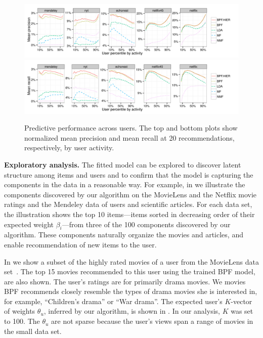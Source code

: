 \begin{figure}[t!]
\centering
\includegraphics[width=\textwidth]{figures/mean_precision_at_20_by_user_percentile.pdf}\\
\includegraphics[width=\textwidth]{figures/mean_recall_at_20_by_user_percentile.pdf}\\
\caption{Predictive performance across users. The top and bottom plots
  show normalized mean precision and mean recall at 20
  recommendations, respectively, by user activity.}
\label{fig:precision_recall_by_user_activity}
\end{figure}


{\bf Exploratory analysis.} The fitted model can be explored to
discover latent structure among items and users and to confirm that
the model is capturing the components in the data in a reasonable
way. For example, in  we illustrate the components
discovered by our algorithm on the MovieLens and the Netflix movie
ratings and the Mendeley data of users and scientific articles. For
each data set, the illustration shows the top 10 items---items sorted
in decreasing order of their expected weight $\beta_i$---from three of
the 100 components discovered by our algorithm. These components
naturally organize the movies and articles, and enable recommendation
of new items to the user.

In  we show a subset of the highly rated
movies of a user from the MovieLens data
set~\cite{Herlocker:1999}. The top 15 movies recommended to this user
using the trained BPF model, are also shown. The user's ratings are
for primarily drama movies. We movies BPF recommends closely resemble
the types of drama movies she is interested in, for example,
``Children's drama'' or ``War drama''. The expected user's $K$-vector
of weights $\theta_u$, inferred by our algorithm, is shown in
. In our analysis, $K$ was set to
100. The $\theta_u$ are not sparse because the user's views span a
range of movies in the small data set.

